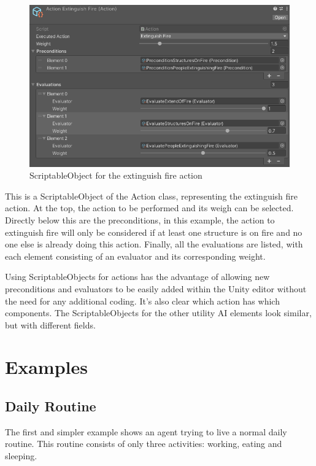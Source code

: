 \begin{figure}[H]
	\centering
		\includegraphics[scale=0.5]{images/utility_ai_scriptableobject_action.png}
	\caption{ScriptableObject for the extinguish fire action}
	\label{fig:utility_ai_scriptableobject_action}
\end{figure}

This is a ScriptableObject of the Action class, representing the extinguish fire action. At the top, the action to be performed and its weigh can be selected. Directly below this are the preconditions, in this example, the action to extinguish fire will only be considered if at least one structure is on fire and no one else is already doing this action. Finally, all the evaluations are listed, with each element consisting of an evaluator and its corresponding weight.

Using ScriptableObjects for actions has the advantage of allowing new preconditions and evaluators to be easily added within the Unity editor without the need for any additional coding. It's also clear which action has which components. The ScriptableObjects for the other utility AI elements look similar, but with different fields.

\newpage

\section{Examples}
\label{sec:utilityai_examples}
\subsection{Daily Routine}
\label{subsec:utilityai_realization_dailyroutine}

The first and simpler example shows an agent trying to live a normal daily routine. This routine consists of only three activities: working, eating and sleeping.

